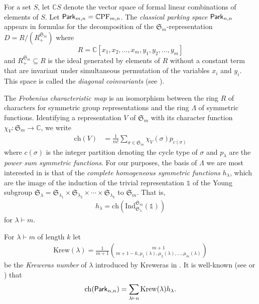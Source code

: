 \documentclass[11pt,reqno]{BICA}
\theoremstyle{definition}
\newcommand{\ch}{\mathrm{ch}}
\newcommand{\Ind}{\mathrm{Ind}}
\newcommand{\PF}{\mathrm{PF}}
\newcommand{\Krew}{\mathrm{Krew}}
\newcommand{\Park}{{{\sf Park}}}
\newcommand{\CC}{\mathbb{C}}
\begin{document}
For a set $S$, let $\CC S$ denote the vector space of formal linear combinations of elements of $S$. Let $\Park_{m,n}=\CC\PF_{m,n}$. The \emph{classical parking space} $\Park_{n,n}$ appears in formulas for the decomposition of the $\mathfrak{S}_m$-representation $D=R/(R_+^{\mathfrak{S}_m})$ where \[R=\CC[x_1,x_2,\ldots,x_m,y_1,y_2,\ldots,y_m]\] and $R_+^{\mathfrak{S}_m}\subseteq R$ is the ideal generated by elements of $R$ without a constant term that are invariant under simultaneous permutation of the variables $x_i$ and $y_i$. This space is called the \emph{diagonal coinvariants} (see \cite{haiman2001vanishing}).

The \emph{Frobenius characteristic map} is an isomorphism between the ring $R$ of characters for symmetric group representations and the ring $\Lambda$ of symmetric functions. Identifying a representation $V$ of $\mathfrak{S}_m$ with its character function $\chi_V:\mathfrak{S}_m\to\CC$, we write \begin{align*}
    \ch(V)&=\frac{1}{m!}\sum_{\sigma\in \mathfrak{S}_m}\chi_V(\sigma)p_{c(\sigma)}
\end{align*} where $c(\sigma)$ is the integer partition denoting the cycle type of $\sigma$ and $p_\lambda$ are the \emph{power sum symmetric functions}. For our purposes, the basis of $\Lambda$ we are most interested in is that of the \emph{complete homogeneous symmetric functions} $h_\lambda$, which are the image of the induction of the trivial representation $\mathbb{1}$ of the Young subgroup $\mathfrak{S}_\lambda=\mathfrak{S}_{\lambda_1}\times \mathfrak{S}_{\lambda_2}\times\cdots\times \mathfrak{S}_{\lambda_k}$ to $\mathfrak{S}_m$. That is, \begin{align*}
    h_\lambda=\ch\left(\Ind_{\mathfrak{S}_\lambda}^{\mathfrak{S}_m}(\mathbb{1})\right)
\end{align*} for $\lambda\vdash m$.

For $\lambda\vdash m$ of length $k$ let \begin{align}
    \Krew(\lambda)=\frac{1}{m+1}{m+1\choose m+1-k,\mu_1(\lambda),\mu_2(\lambda),\ldots,\mu_m(\lambda)}\label{eq:kreweras_number}
\end{align} be the \emph{Kreweras number} of $\lambda$
introduced by Kreweras in \cite{K72}. It is well-known (see \cite{haiman1994conjectures} or \cite[Proposition 2.2]{stanley1997parking}) that \begin{align*}
    \ch(\Park_{n,n})=\sum_{\lambda\vdash n} \Krew(\lambda)h_\lambda.
\end{align*} 
\end{document}
